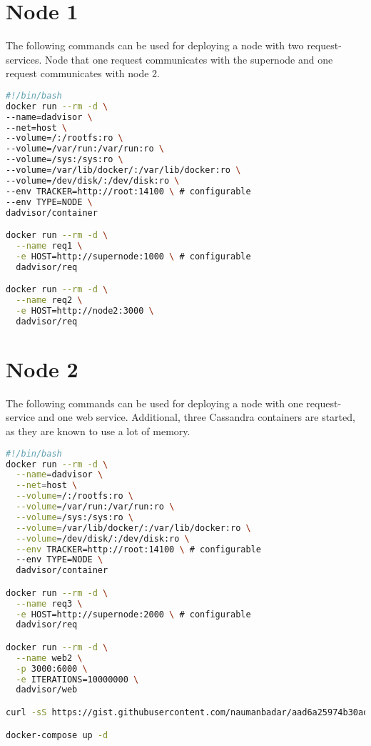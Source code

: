 \section{Node 1}
The following commands can be used for deploying a node with two request-services. Node that one request communicates with the supernode and one request communicates with node 2.
\begin{lstlisting}[language=bash, caption={Node 1 command}]
#!/bin/bash
docker run --rm -d \
--name=dadvisor \
--net=host \
--volume=/:/rootfs:ro \
--volume=/var/run:/var/run:ro \
--volume=/sys:/sys:ro \
--volume=/var/lib/docker/:/var/lib/docker:ro \
--volume=/dev/disk/:/dev/disk:ro \
--env TRACKER=http://root:14100 \ # configurable
--env TYPE=NODE \
dadvisor/container

docker run --rm -d \
  --name req1 \
  -e HOST=http://supernode:1000 \ # configurable
  dadvisor/req

docker run --rm -d \
  --name req2 \
  -e HOST=http://node2:3000 \
  dadvisor/req
\end{lstlisting}

\section{Node 2}
The following commands can be used for deploying a node with one request-service and one web service. Additional, three Cassandra containers are started, as they are known to use a lot of memory.
\begin{lstlisting}[language=bash, caption={Node 2 command}]
#!/bin/bash
docker run --rm -d \
  --name=dadvisor \
  --net=host \
  --volume=/:/rootfs:ro \
  --volume=/var/run:/var/run:ro \
  --volume=/sys:/sys:ro \
  --volume=/var/lib/docker/:/var/lib/docker:ro \
  --volume=/dev/disk/:/dev/disk:ro \
  --env TRACKER=http://root:14100 \ # configurable
  --env TYPE=NODE \
  dadvisor/container

docker run --rm -d \
  --name req3 \
  -e HOST=http://supernode:2000 \ # configurable
  dadvisor/req

docker run --rm -d \
  --name web2 \
  -p 3000:6000 \
  -e ITERATIONS=10000000 \
  dadvisor/web

curl -sS https://gist.githubusercontent.com/naumanbadar/aad6a25974b30adcb3c89b5f868627da/raw/b72129a8b3d5eff7597c4daf01267060dc1c30c7/docker-compose-cassandra-cluster.yml > docker-compose.yml

docker-compose up -d
\end{lstlisting}